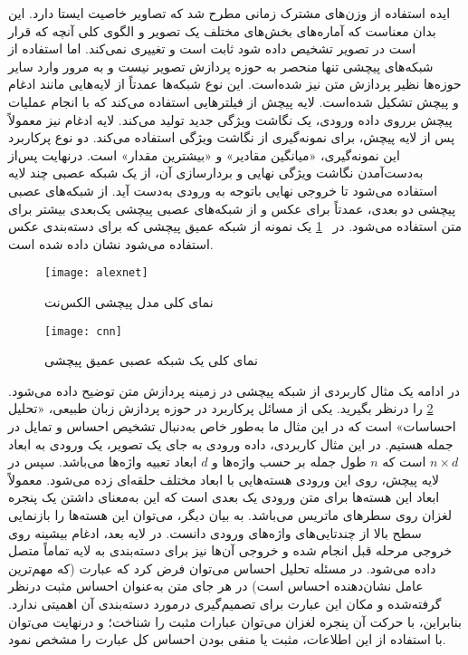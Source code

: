  ایده استفاده از وزن‌های‌ مشترک زمانی مطرح شد که تصاویر خاصیت ایستا دارد. این بدان معناست که آماره‌های بخش‌های مختلف یک تصویر و الگوی کلی آنچه که قرار است در تصویر تشخیص داده شود ثابت است و تغییری نمی‌کند. اما استفاده از شبکه‌های پیچشی تنها منحصر به حوزه پردازش تصویر نیست و به‌ مرور وارد سایر حوزه‌ها نظیر پردازش متن نیز شده‌است.
 این نوع شبکه‌ها عمدتاً از لایه‌هایی مانند ادغام و پیچش تشکیل شده‌است. لایه پیچش از فیلترهایی استفاده می‌کند که با
 انجام عملیات پیچش برروی داده ورودی، یک نگاشت ویژگی جدید تولید می‌کند. لایه ادغام نیز معمولاً پس از لایه پیچش،
 برای نمونه‌گیری از نگاشت ویژگی استفاده می‌کند. دو نوع پرکاربرد این نمونه‌گیری، «میانگین مقادیر» و «بیشترین مقدار» است. درنهایت پس‌از به‌دست‌آمدن نگاشت ویژگی نهایی و بردارسازی آن، از یک شبکه عصبی چند لایه استفاده می‌شود تا خروجی
 نهایی باتوجه ‌به ورودی به‌دست آید. از شبکه‌های عصبی پیچشی دو‌ بعدی، عمدتاً برای عکس و از شبکه‌های عصبی پیچشی یک‌بعدی بیشتر برای متن استفاده می‌شود. در \figurename~\ref{fig.alexnet} یک نمونه از شبکه عمیق پیچشی که برای دسته‌بندی عکس استفاده می‌شود نشان داده شده ‌است.

\begin{figure}[!h]
\texttt{[image: alexnet]}
\centering
\caption{نمای کلی مدل پیچشی الکس‌نت \citep{krizhevsky2012imagenet}}
\label{fig.alexnet}
\end{figure}

\vspace{3mm}

\begin{figure}[!h]
\texttt{[image: cnn]}
\centering
\caption{نمای کلی یک شبکه عصبی عمیق پیچشی \citep{le2017convolutional}}
\label{fig.sentimentAnalyzing}
\end{figure}

در ادامه یک مثال کاربردی از شبکه پیچشی در زمینه پردازش متن توضیح داده می‌شود. \figurename~\ref{fig.sentimentAnalyzing} را درنظر بگیرید. یکی از مسائل  پرکاربرد در حوزه پردازش زبان طبیعی، «تحلیل احساسات» است که در این مثال ما به‌طور خاص  به‌دنبال تشخیص احساس و تمایل در جمله  هستیم. در این مثال کاربردی، داده ورودی به جای یک تصویر، یک ورودی به ابعاد  $n \times d$  است که $n$ طول جمله بر حسب واژه‌ها و $d$ ابعاد تعبیه واژه‌ها می‌باشد. سپس در لایه پیچش، روی این ورودی هسته‌هایی با ابعاد مختلف حلقه‌ای زده می‌شود. معمولاً ابعاد این هسته‌ها برای متن ورودی یک بعدی است که این به‌معنای داشتن یک پنجره لغزان روی سطرهای ماتریس می‌باشد. به بیان دیگر، می‌توان این هسته‌ها را بازنمایی سطح بالا از چندتایی‌های واژه‌های ورودی دانست. در لایه بعد، ادغام بیشینه روی خروجی مرحله قبل  انجام شده و خروجی آن‌ها نیز برای دسته‌بندی به لایه تماماً متصل داده می‌شود. در مسئله تحلیل احساس می‌توان فرض کرد که عبارت  (که مهم‌ترین عامل نشان‌دهنده احساس است)  در هر جای متن  به‌عنوان احساس مثبت درنظر گرفته‌شده و مکان این عبارت برای تصمیم‌گیری درمورد دسته‌بندی آن اهمیتی ندارد. بنابراین، با حرکت آن پنجره لغزان می‌توان عبارات مثبت را شناخت؛ و درنهایت می‌توان با استفاده از این اطلاعات، مثبت یا منفی بودن احساس کل عبارت را مشخص نمود.

